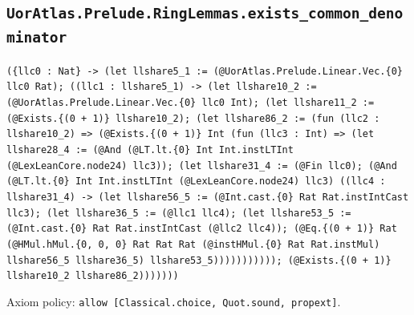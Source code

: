 \documentclass[11pt]{article}
\begin{document}
\subsection*{\texttt{UorAtlas.Prelude.RingLemmas.exists\_common\_denominator}}
\noindent\texttt{(\{llc0 : Nat\} -> (let llshare5\_1 := (@UorAtlas.Prelude.Linear.Vec.\{0\} llc0 Rat); ((llc1 : llshare5\_1) -> (let llshare10\_2 := (@UorAtlas.Prelude.Linear.Vec.\{0\} llc0 Int); (let llshare11\_2 := (@Exists.\{(0 + 1)\} llshare10\_2); (let llshare86\_2 := (fun (llc2 : llshare10\_2) => (@Exists.\{(0 + 1)\} Int (fun (llc3 : Int) => (let llshare28\_4 := (@And (@LT.lt.\{0\} Int Int.instLTInt (@LexLeanCore.node24) llc3)); (let llshare31\_4 := (@Fin llc0); (@And (@LT.lt.\{0\} Int Int.instLTInt (@LexLeanCore.node24) llc3) ((llc4 : llshare31\_4) -> (let llshare56\_5 := (@Int.cast.\{0\} Rat Rat.instIntCast llc3); (let llshare36\_5 := (@llc1 llc4); (let llshare53\_5 := (@Int.cast.\{0\} Rat Rat.instIntCast (@llc2 llc4)); (@Eq.\{(0 + 1)\} Rat (@HMul.hMul.\{0, 0, 0\} Rat Rat Rat (@instHMul.\{0\} Rat Rat.instMul) llshare56\_5 llshare36\_5) llshare53\_5))))))))))); (@Exists.\{(0 + 1)\} llshare10\_2 llshare86\_2)))))))}\par
\noindent Axiom policy: \texttt{allow [Classical.choice, Quot.sound, propext]}.\par
\end{document}
